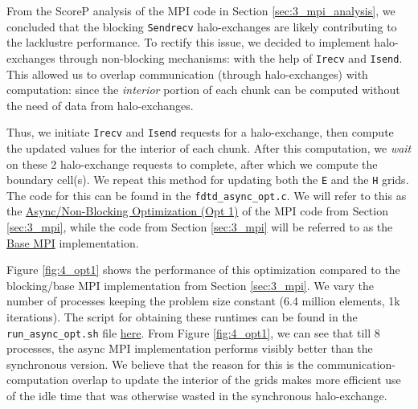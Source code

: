 \documentclass[a4paper,10pt]{article}
\begin{document}
\begin{multicols}{2}
From the ScoreP analysis of the MPI code in Section \ref{sec:3_mpi_analysis}, we concluded that the blocking \verb|Sendrecv| halo-exchanges are likely contributing to the lacklustre performance. To rectify this issue, we decided to implement halo-exchanges through non-blocking mechanisms: with the help of \verb|Irecv| and \verb|Isend|. This allowed us to overlap communication (through halo-exchanges) with computation: since the \textit{interior} portion of each chunk can be computed without the need of data from halo-exchanges.

Thus, we initiate  \verb|Irecv| and \verb|Isend| requests for a halo-exchange, then compute the updated values for the interior of each chunk. After this computation, we \textit{wait} on these 2 halo-exchange requests to complete, after which we compute the boundary cell(s). We repeat this method for updating both the \verb|E| and the \verb|H| grids. The code for this can be found in the \verb|fdtd_async_opt.c|. We will refer to this as the \underline{Async/Non-Blocking Optimization (Opt 1)} of the MPI code from Section \ref{sec:3_mpi}, while the code from Section \ref{sec:3_mpi} will be referred to as the \underline{Base MPI} implementation.

Figure \ref{fig:4_opt1} shows the performance of this optimization compared to the blocking/base MPI implementation from Section \ref{sec:3_mpi}. We vary the number of processes keeping the problem size constant (6.4 million elements, 1k iterations). The script for obtaining these runtimes can be found in the \verb|run_async_opt.sh| file \href{https://github.com/paulmyr/DD2356-MethodsHPC/blob/master/5_project/4_opt/run_async_opt.sh}{here}. From Figure \ref{fig:4_opt1}, we can see that till 8 processes, the async MPI implementation performs visibly better than the synchronous version. We believe that the reason for this is the communication-computation overlap to update the interior of the grids makes more efficient use of the idle time that was otherwise wasted in the synchronous halo-exchange.


\end{multicols}
\end{document}

